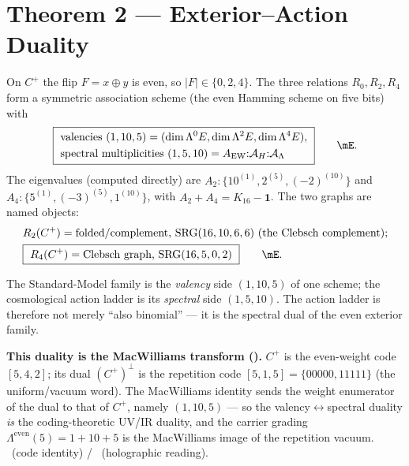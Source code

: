 \section*{Theorem 2 --- Exterior--Action Duality}
On $C^+$ the flip $F=x\oplus y$ is even, so $|F|\in\{0,2,4\}$. The three relations
$R_0,R_2,R_4$ form a symmetric association scheme (the even Hamming scheme on five bits) with
\begin{equation}
  \boxed{\ \begin{aligned}
    &\text{valencies}\ (1,10,5)=(\dim\Lambda^0E,\dim\Lambda^2E,\dim\Lambda^4E),\\
    &\text{spectral multiplicities}\ (1,5,10)=\AEW{:}\AH{:}\AL
  \end{aligned}\ }\qquad\mE .
\end{equation}
The eigenvalues (computed directly) are
$A_2:\{10^{(1)},2^{(5)},(-2)^{(10)}\}$ and $A_4:\{5^{(1)},(-3)^{(5)},1^{(10)}\}$, with
$A_2+A_4=K_{16}-\mathbf 1$. The two graphs are named objects:
\begin{equation}
\begin{aligned}
  &R_2(C^+)=\text{folded/complement, } \mathrm{SRG}(16,10,6,6)\ (\text{the Clebsch complement});\\
  &\boxed{\ R_4(C^+)=\text{Clebsch graph, } \mathrm{SRG}(16,5,0,2)\ }\qquad\mE .
\end{aligned}
\end{equation}
\begin{remark}
The Standard-Model family is the \emph{valency} side $(1,10,5)$ of one scheme; the cosmological action
ladder is its \emph{spectral} side $(1,5,10)$. The action ladder is therefore not merely ``also
binomial'' --- it is the spectral dual of the even exterior family. \mC
\end{remark}
\noindent\textbf{This duality is the MacWilliams transform ().} $C^+$ is the
even-weight code $[5,4,2]$; its dual $(C^+)^\perp$ is the repetition code $[5,1,5]=\{00000,11111\}$ (the
uniform/vacuum word). The MacWilliams identity sends the weight enumerator of the dual to that of $C^+$, namely
$(1,10,5)$ --- so the valency$\leftrightarrow$spectral duality \emph{is} the coding-theoretic UV/IR duality, and
the carrier grading $\Lambda^{\mathrm{even}}(5)=1{+}10{+}5$ is the MacWilliams image of the repetition vacuum.
\mE\ (code identity) / \mC\ (holographic reading).

